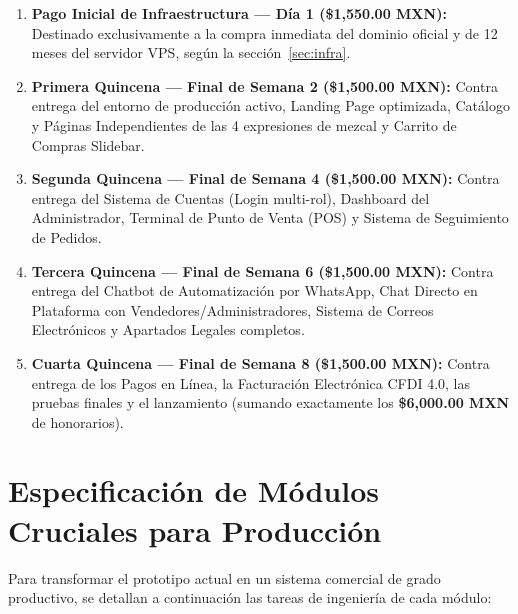 \documentclass[11pt,letterpaper]{article}
\begin{document}
\begin{enumerate}[label=\textbf{\arabic*.}]
    \item \textbf{Pago Inicial de Infraestructura — Día 1 (\$1,550.00 MXN):} Destinado exclusivamente a la compra inmediata del dominio oficial y de 12 meses del servidor VPS, según la sección~\ref{sec:infra}.
    \item \textbf{Primera Quincena — Final de Semana 2 (\$1,500.00 MXN):} Contra entrega del entorno de producción activo, Landing Page optimizada, Catálogo y Páginas Independientes de las 4 expresiones de mezcal y Carrito de Compras Slidebar.
    \item \textbf{Segunda Quincena — Final de Semana 4 (\$1,500.00 MXN):} Contra entrega del Sistema de Cuentas (Login multi-rol), Dashboard del Administrador, Terminal de Punto de Venta (POS) y Sistema de Seguimiento de Pedidos.
    \item \textbf{Tercera Quincena — Final de Semana 6 (\$1,500.00 MXN):} Contra entrega del Chatbot de Automatización por WhatsApp, Chat Directo en Plataforma con Vendedores/Administradores, Sistema de Correos Electrónicos y Apartados Legales completos.
    \item \textbf{Cuarta Quincena — Final de Semana 8 (\$1,500.00 MXN):} Contra entrega de los Pagos en Línea, la Facturación Electrónica CFDI 4.0, las pruebas finales y el lanzamiento (sumando exactamente los \textbf{\$6,000.00 MXN} de honorarios).
\end{enumerate}

\section{Especificación de Módulos Cruciales para Producción}

Para transformar el prototipo actual en un sistema comercial de grado productivo, se detallan a continuación las tareas de ingeniería de cada módulo:
\end{document}
